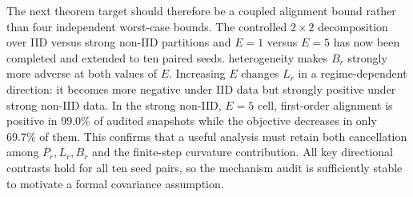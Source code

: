 The next theorem target should therefore be a coupled alignment bound rather
than four independent worst-case bounds.  The controlled $2\times2$
decomposition over IID versus strong non-IID partitions and $E=1$ versus
$E=5$ has now been completed and extended to ten paired seeds.
heterogeneity makes $B_r$ strongly more adverse at both values of $E$.
Increasing $E$ changes $L_r$ in a regime-dependent direction: it becomes more
negative under IID data but strongly positive under strong non-IID data.  In
the strong non-IID, $E=5$ cell, first-order alignment is positive in $99.0\%$
of audited snapshots while the objective decreases in only $69.7\%$ of them.
This confirms that a useful analysis must retain both cancellation among
$P_r,L_r,B_r$ and the finite-step curvature contribution.  All key directional
contrasts hold for all ten seed pairs, so the mechanism audit is sufficiently
stable to motivate a formal covariance assumption.
